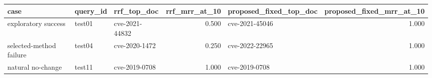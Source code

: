 \begin{tabular}{lllrlr}
\toprule
case & query\_id & rrf\_top\_doc & rrf\_mrr\_at\_10 & proposed\_fixed\_top\_doc & proposed\_fixed\_mrr\_at\_10 \\
\midrule
exploratory success & test01 & cve-2021-44832 & 0.500 & cve-2021-45046 & 1.000 \\
selected-method failure & test04 & cve-2020-1472 & 0.250 & cve-2022-22965 & 1.000 \\
natural no-change & test11 & cve-2019-0708 & 1.000 & cve-2019-0708 & 1.000 \\
\bottomrule
\end{tabular}
